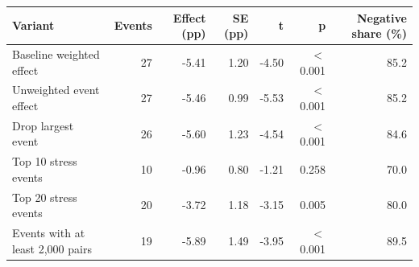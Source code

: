 \begin{tabular}{lrrrrrr}
\toprule
Variant & Events & Effect (pp) & SE (pp) & t & p & Negative share (\%) \\
\midrule
Baseline weighted effect & 27 & -5.41 & 1.20 & -4.50 & \ensuremath{<}0.001 & 85.2 \\
Unweighted event effect & 27 & -5.46 & 0.99 & -5.53 & \ensuremath{<}0.001 & 85.2 \\
Drop largest event & 26 & -5.60 & 1.23 & -4.54 & \ensuremath{<}0.001 & 84.6 \\
Top 10 stress events & 10 & -0.96 & 0.80 & -1.21 & 0.258 & 70.0 \\
Top 20 stress events & 20 & -3.72 & 1.18 & -3.15 & 0.005 & 80.0 \\
Events with at least 2,000 pairs & 19 & -5.89 & 1.49 & -3.95 & \ensuremath{<}0.001 & 89.5 \\
\bottomrule
\end{tabular}
